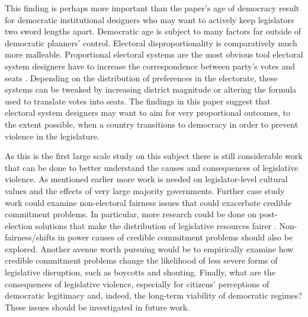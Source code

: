 \documentclass[a4paper]{article}\usepackage[]{graphicx}\usepackage[]{color}
\begin{document}
This finding is perhaps more important than the paper's age of democracy result for democratic institutional designers who may want to actively keep legislators two sword lengths apart. Democratic age is subject to many factors far outside of democratic planners' control. Electoral disproportionality is comparatively much more malleable. Proportional electoral systems are the most obvious tool electoral system designers have to increase the correspondence between party's votes and seats \citep{Carey2011}. Depending on the distribution of preferences in the electorate, these systems can be tweaked by increasing district magnitude or altering the formula used to translate votes into seats. The findings in this paper suggest that electoral system designers may want to aim for very proportional outcomes, to the extent possible, when a country transitions to democracy in order to prevent violence in the legislature.

As this is the first large scale study on this subject there is still considerable work that can be done to better understand the causes and consequences of legislative violence. As mentioned earlier more work is needed on legislator-level cultural values and the effects of very large majority governments. Further case study work could examine non-electoral fairness issues that could exacerbate credible commitment problems. In particular, more research could be done on post-election solutions that make the distribution of legislative resources fairer \cite[for example see][who examined informal minority party access to power in Japan's Diet]{Wolfe2004}. Non-fairness/shifts in power causes of credible commitment problems should also be explored. Another avenue worth pursuing would be to empirically examine how credible commitment problems change the likelihood of less severe forms of legislative disruption, such as boycotts and shouting. Finally, what are the consequences of legislative violence, especially for citizens' perceptions of democratic legitimacy and, indeed, the long-term viability of democratic regimes? These issues should be investigated in future work.




\end{document}
